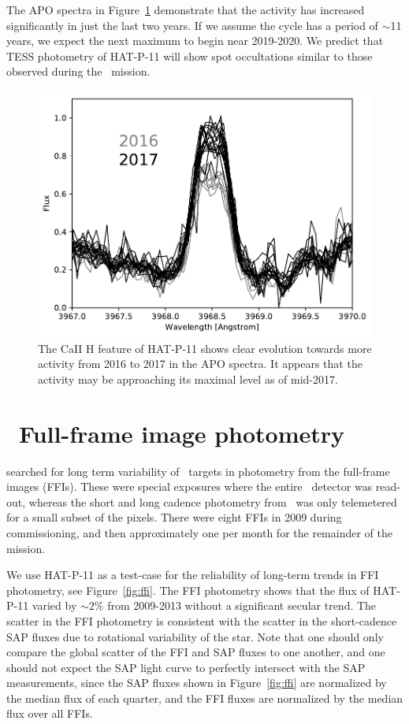 The APO spectra in Figure~\ref{fig:h} demonstrate that the activity has increased significantly in just the last two years. If we assume the cycle has a period of $\sim$11 years, we expect the next maximum to begin near 2019-2020. We predict that TESS photometry of HAT-P-11 will show spot occultations similar to those observed during the \kepler\ mission.

\begin{figure}
\begin{center}
\includegraphics[scale=0.55]{sindex/close_up_h.pdf}
\end{center}
\caption{The CaII H feature of HAT-P-11 shows clear evolution towards more activity from 2016 to 2017 in the APO spectra. It appears that the activity may be approaching its maximal level as of mid-2017.}
\label{fig:h}
\end{figure}

\section{\kepler\ Full-frame image photometry} \label{sec:ffi}

\citet{Montet2017} searched for long term variability of \kepler\ targets in photometry from the full-frame images (FFIs). These were special exposures where the entire \kepler\ detector was read-out, whereas the short and long cadence photometry from \kepler\ was only telemetered for a small subset of the pixels. There were eight FFIs in 2009 during commissioning, and then approximately one per month for the remainder of the mission.

We use HAT-P-11 as a test-case for the reliability of long-term trends in FFI photometry, see Figure~\ref{fig:ffi}. The FFI photometry shows that the flux of HAT-P-11 varied by $\sim 2\%$ from 2009-2013 without a significant secular trend. The scatter in the FFI photometry is consistent with the scatter in the short-cadence SAP fluxes due to rotational variability of the star. Note that one should only compare the global scatter of the FFI and SAP fluxes to one another, and one should not expect the SAP light curve to perfectly intersect with the SAP measurements, since the SAP fluxes shown in Figure~\ref{fig:ffi} are normalized by the median flux of each quarter, and the FFI fluxes are normalized by the median flux over all FFIs. 

